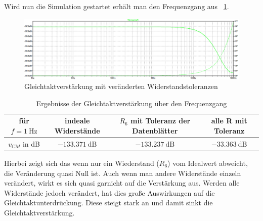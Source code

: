         Wird nun die Simulation gestartet erhält man den Frequenzgang aus ~\ref{toleranzgraf}.
        \begin{figure}[ht!]
            \centering
            \includegraphics[width=\linewidth]{toleranzwerte.PNG}
            \caption{Gleichtaktverstärkung mit veränderten Widerstandstoleranzen}
            \label{toleranzgraf}
        \end{figure}

        \begin{table}[h!]
            \centering
            \caption{Ergebnisse der Gleichtaktverstärkung über den Frequenzgang}
            \begin{tabular}{|c|c|c|c|}
                \hline
                für \(f=\SI{1}{\Hz}\)  & indeale Widerstände & \(R_6\) mit Toleranz der Datenblätter & alle R mit Toleranz\\ \hline 
                \(v_{CM}\) in dB & \(\SI{-133,371}{\dB}\)&\(-\SI{133,237}{\dB}\)&\(-\SI{33,363}{\dB}\)\\ \hline
            \end{tabular}
        \end{table}
        Hierbei zeigt sich das wenn nur ein Wiederstand (\(R_6\)) vom Idealwert abweicht, die Veränderung quasi Null ist. Auch wenn man andere Widerstände einzeln verändert, wirkt es sich quasi garnicht auf die Verstärkung aus. 
        Werden alle Widerstände jedoch verändert, hat dies große Auswirkungen auf die Gleichtaktunterdrückung. Diese steigt stark an und damit sinkt die Gleichtaktverstärkung. 
